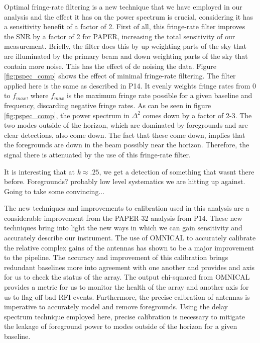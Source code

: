 \documentclass[twocolumn,numberedappendix]{emulateapj} \shorttitle{PSA64}
\begin{document}
Optimal fringe-rate filtering is a new technique that we have employed in our
analysis and the effect it has on the power spectrum is crucial, considering it
has a sensitivity benefit of a factor of 2. First of all, this fringe-rate
filter improves the SNR by a factor of 2 for PAPER, increasing the total
sensitivity of our measurement. Briefly, the filter does this by up weighting
parts of the sky that are illuminated by the primary beam and down weighting
parts of the sky that contain more noise. This has the effect of de noising the
data. Figure \ref{fig:pspec_comp} shows the effect of minimal fringe-rate
filtering. The filter applied here is the same as described in P14.
It evenly weights fringe rates from 0 to $f_{max}$,
where $f_{max}$ is the maximum fringe rate possible for a given baseline and
frequency, discarding negative fringe rates. As can be seen in figure
\ref{fig:pspec_comp}, the power spectrum in $\Delta^{2}$ comes down by a factor of
2-3. The two modes outside of the horizon, which are dominated by foregrounds
and are clear detections, also come down. The fact that these come down, implies
that the foregrounds are down in the beam possibly near the horizon. Therefore,
the signal there is attenuated by the use of this fringe-rate filter. 

It is interesting that at $k\approx.25$, we get a detection of something that
wasnt there before. Foregrounds? probably low level systematics we are hitting
up against. Going to take some convincing...

The new techniques and improvements to calibration used in this analysis are a
considerable improvement from the PAPER-32 analysis from P14.
These new techniques bring into light the new ways in
which we can gain sensitivity and accurately describe our instrument. The use of
OMNICAL to accurately calibrate the relative complex gains of the antennas has
shown to be a major improvement to the pipeline. The accuracy and improvement of
this calibration brings redundant baselines more into agreement with one another
and provides and axis for us to check the status of the array. The output 
chi-squared from OMNICAL provides a metric for us to monitor the health of the
array and another axis for us to flag off bad RFI events. Furthermore, the
precise calbration of antennas is imperative to accurately model and remove
foregrounds. Using the delay spectrum technique employed here, precise
calibration is necessary to mitigate the leakage of foreground power to modes
outside of the horizon for a given baseline. 
\end{document}
